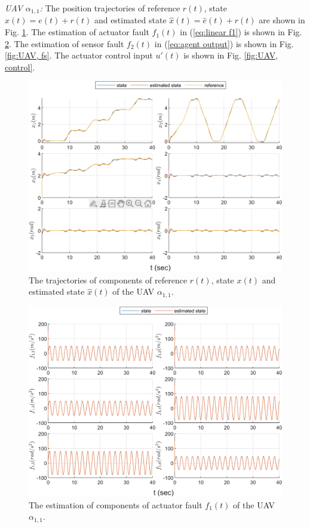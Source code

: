 \documentclass{ieeeaccess}
\begin{document}
\textit{UAV $\alpha_{1,1}$:}
The position trajectories of reference $r(t)$, state $x(t) = e(t) + r(t)$ and estimated state $\hat{x}(t) = \hat{e}(t) + r(t)$ are shown in Fig. \ref{fig:UAV, state}. The estimation of actuator fault $f_1(t)$ in (\ref{eq:linear f1}) is shown in Fig. \ref{fig:UAV, fa}. The estimation of sensor fault $f_2(t)$ in (\ref{eq:agent output}) is shown in Fig. \ref{fig:UAV, fs}. The actuator control input $u'(t)$ is shown in Fig. \ref{fig:UAV, control}.
\begin{figure}[htbp]
    \centering
    \includegraphics[scale=.57]{fig/uav (1).png}\caption{The trajectories of components of reference $r(t)$, state $x(t)$ and estimated state $\hat{x}(t)$ of the UAV $\alpha_{1,1}$.}%
    \label{fig:UAV, state}
\end{figure}
\begin{figure}[htbp]
    \centering
    \includegraphics[scale=.57]{fig/uav (2).png}\caption{The estimation of components of actuator fault $f_1(t)$ of the UAV $\alpha_{1,1}$.}
    \label{fig:UAV, fa}
\end{figure}
\end{document}
